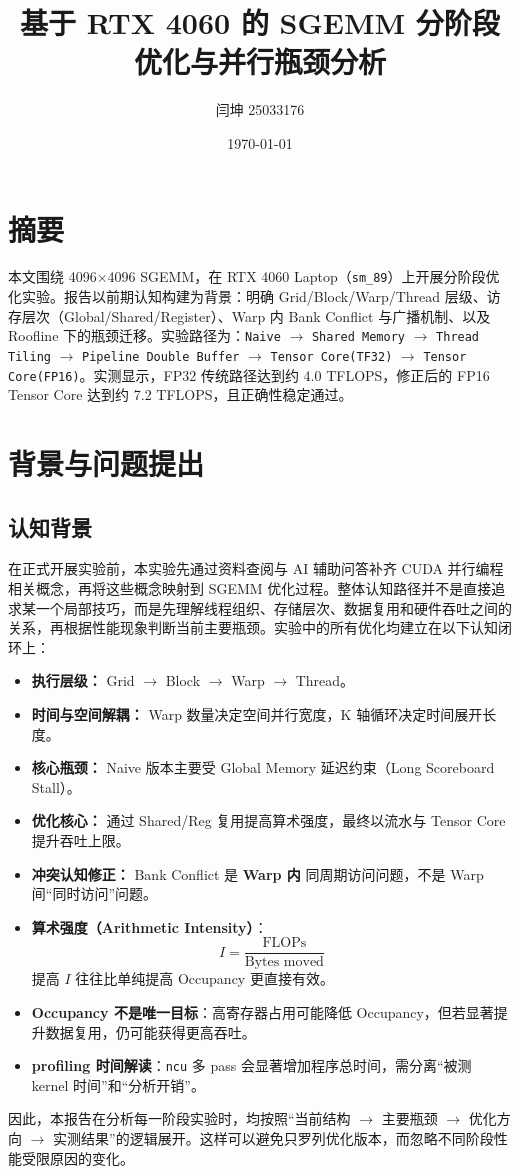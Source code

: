 \documentclass[12pt,a4paper]{ctexart}
\title{基于 RTX 4060 的 SGEMM 分阶段优化与并行瓶颈分析}
\author{闫坤 25033176}
\date{\today}
\begin{document}
\maketitle
\tableofcontents
\newpage

\section{摘要}
本文围绕 4096\(\times\)4096 SGEMM，在 RTX 4060 Laptop（\texttt{sm\_89}）上开展分阶段优化实验。报告以前期认知构建为背景：明确 Grid/Block/Warp/Thread 层级、访存层次（Global/Shared/Register）、Warp 内 Bank Conflict 与广播机制、以及 Roofline 下的瓶颈迁移。实验路径为：\texttt{Naive} $\rightarrow$ \texttt{Shared Memory} $\rightarrow$ \texttt{Thread Tiling} $\rightarrow$ \texttt{Pipeline Double Buffer} $\rightarrow$ \texttt{Tensor Core(TF32)} $\rightarrow$ \texttt{Tensor Core(FP16)}。实测显示，FP32 传统路径达到约 4.0 TFLOPS，修正后的 FP16 Tensor Core 达到约 7.2 TFLOPS，且正确性稳定通过。

\section{背景与问题提出}
\subsection{认知背景}
在正式开展实验前，本实验先通过资料查阅与 AI 辅助问答补齐 CUDA 并行编程相关概念，再将这些概念映射到 SGEMM 优化过程。整体认知路径并不是直接追求某一个局部技巧，而是先理解线程组织、存储层次、数据复用和硬件吞吐之间的关系，再根据性能现象判断当前主要瓶颈。实验中的所有优化均建立在以下认知闭环上：
\begin{itemize}[leftmargin=2em]
  \item \textbf{执行层级：} Grid $\rightarrow$ Block $\rightarrow$ Warp $\rightarrow$ Thread。
  \item \textbf{时间与空间解耦：} Warp 数量决定空间并行宽度，K 轴循环决定时间展开长度。
  \item \textbf{核心瓶颈：} Naive 版本主要受 Global Memory 延迟约束（Long Scoreboard Stall）。
  \item \textbf{优化核心：} 通过 Shared/Reg 复用提高算术强度，最终以流水与 Tensor Core 提升吞吐上限。
  \item \textbf{冲突认知修正：} Bank Conflict 是 \textbf{Warp 内} 同周期访问问题，不是 Warp 间“同时访问”问题。
  \item \textbf{算术强度（Arithmetic Intensity）}：
  \[
  I = \frac{\text{FLOPs}}{\text{Bytes moved}}
  \]
  提高 \(I\) 往往比单纯提高 Occupancy 更直接有效。
  \item \textbf{Occupancy 不是唯一目标}：高寄存器占用可能降低 Occupancy，但若显著提升数据复用，仍可能获得更高吞吐。
  \item \textbf{profiling 时间解读}：\texttt{ncu} 多 pass 会显著增加程序总时间，需分离“被测 kernel 时间”和“分析开销”。
\end{itemize}
因此，本报告在分析每一阶段实验时，均按照“当前结构 $\rightarrow$ 主要瓶颈 $\rightarrow$ 优化方向 $\rightarrow$ 实测结果”的逻辑展开。这样可以避免只罗列优化版本，而忽略不同阶段性能受限原因的变化。
\end{document}
